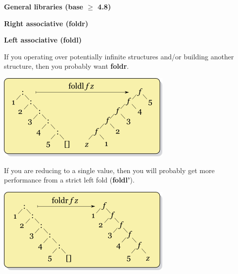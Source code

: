 

\addtolength{\wpXoffset}{5.5cm}
\addtolength{\wpYoffset}{13.1cm}


\usepackage{float}





{\huge \bfseries General libraries (base $\geq$ 4.8)\\[0.2cm]}

\HRule%


\begin{box1}
\begin{multicols}{2}
{\Large \bfseries Right associative (foldr)}

\columnbreak

{\Large \bfseries Left associative (foldl)}
\end{multicols}
\begin{multicols}{4}
If you operating over potentially infinite structures and/or building another
structure, then you probably want \textbf{foldr}.
\columnbreak

\includegraphics[width=\linewidth,keepaspectratio=true]{images/foldl.png}

\columnbreak

If you are reducing to a single value, then you will probably get more
performance from a strict left fold (\textbf{foldl'}).

\columnbreak

\includegraphics[width=\linewidth,keepaspectratio=true]{images/foldr.png}


\end{multicols}
\end{box1}
